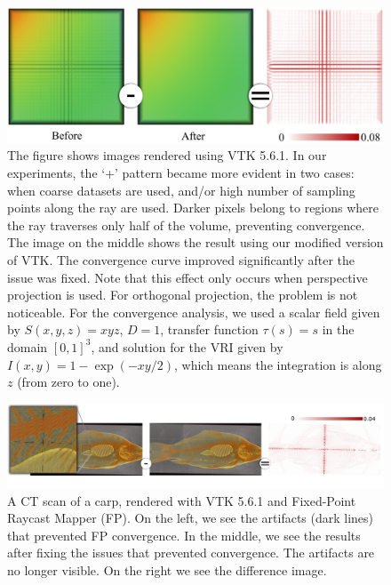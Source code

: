 \begin{figure}[b]
\centering
\includegraphics[width=0.7\linewidth]{chapter5/figures/fp-fcm-before-after.png}
\caption{\label{fig:fp-rcm-example} The figure shows images rendered
  using VTK 5.6.1. In our experiments, the `+'  pattern became more evident
  in two cases:  when coarse datasets are used, and/or high number
   of sampling points along the ray are used. 
   Darker pixels belong to regions where the
  ray traverses only half of the volume, preventing convergence. The
  image on the middle shows the result using our modified version of
  VTK. The convergence curve improved significantly after the 
  issue was fixed. Note that this
  effect only occurs when perspective projection is used. For
  orthogonal projection, the problem is not noticeable. 
  For the convergence analysis, we used a scalar field
  given by $S(x,y,z) = xyz$, $D=1$, transfer function $\tau(s) = s$ in the
  domain $\left[0,1\right]^3$, and solution for the VRI given by
  $I(x,y) = 1-\exp\left( -x y / 2 \right)$, which means the integration is 
  along $z$ (from zero to one).}
\end{figure}

\begin{figure}[t]
\centering
\includegraphics[width=1\linewidth]{chapter5/figures/carp-difference.png}
\caption{\label{fig:real-dataset-examples}
  A CT scan of a carp,
  rendered with VTK 5.6.1 and Fixed-Point Raycast Mapper (FP). On the
  left, we see the artifacts (dark lines) that prevented FP convergence. In the
  middle, we see the results after fixing the issues that prevented
  convergence. The artifacts are no longer visible. On the right we
  see the difference image.}
\end{figure}



